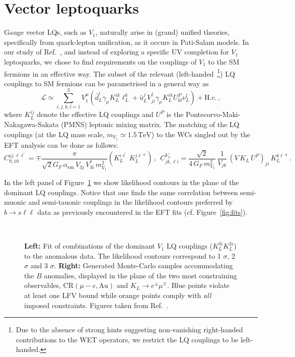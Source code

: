 \documentclass[a4paper,11pt]{article}
\def\bsll{b \to s\ell\ell}
\begin{document}
\section{Vector leptoquarks}
Gauge vector LQs, such as $V_1$, naturally arise in (grand) unified theories, specifically from quark-lepton unification, as it occurs in Pati-Salam models.
In our study of Ref.~\cite{Hati:2019ufv}, and  
instead of exploring a specific UV completion for $V_1$ leptoquarks, we chose to find requirements on the couplings of $V_1$ to the SM fermions in an effective way.
The subset of the relevant 
(left-handed~\footnote{Due to the absence of strong hints 
suggesting non-vanishing right-handed contributions to the WET operators, we restrict the LQ couplings to be left-handed.}) LQ couplings to SM fermions 
can be parametrised in a general way as
\begin{equation}
    \mathcal L \simeq \sum_{i,j,k,l = 1}^{3} V_1^\mu \left(\bar d_L^i\gamma_\mu K_L^{ik}\ell_L^k + \bar u_L^j V_{ji}^\dagger \gamma_\mu K_L^{ik} U_{kl}^P\nu_L^l \right) + \mathrm{H.c.}\,,
\end{equation}
where $K_L^{ij}$ denote the effective LQ couplings and $U^P$ is the Pontecorvo-Maki-Nakagawa-Sakata (PMNS) leptonic mixing matrix.
The matching of the LQ couplings (at the LQ mass scale, $m_{V_1} \simeq 1.5\,\mathrm{TeV}$) to the WCs singled out by the EFT analysis can be done as follows:
\begin{equation}
C^{ij;\ell \ell^{\prime}}_{9,10} = \mp\frac{\pi}{\sqrt{2}G_F\,\alpha_\mathrm{em}\,V_{3j}\,V_{3i}^{\ast} \,m_{V_1}^2}\left(K_L^{i
  \ell^\prime} \,K_L^{j\ell\ast} \right)\,,\ \ 
  C_{jk,\ell i}^{V_L} = \frac{\sqrt{2}}{4\,G_{F}\,m_{V_1}^2}\,
  \frac{1}{V_{jk}}\,
  (V\,K_{L}\, U^P)_{ji}\, K_{L}^{k\ell\ast}\,.
  \label{eqn:CV}
\end{equation}

In the left panel of Figure~\ref{fig:LQfit} we show likelihood contours in the plane of the dominant LQ couplings. Notice that one finds the same correlation between semi-muonic and semi-tauonic couplings in the likelihood contours preferred by $\bsll$ data as previously encountered in the EFT fits (cf. Figure~\ref{fig:fits}).

\begin{figure}
    \centering
    \mbox{
    \raisebox{-8mm}{\texttt{[image: RK\_RD\_mue.pdf]}}}
    \caption{{\bf Left:} Fit of combinations of the dominant $V_1$ LQ couplings ($K_L^{3i}K_L^{2i}$) to the anomalous data. The likelihood contours correspond to 1 $\sigma$, 2 $\sigma$ and 3 $\sigma$. {\bf Right:} Generated Monte-Carlo samples accommodating the $B$ anomalies, displayed in the plane of the two most constraining observables, CR$(\mu-e, \mathrm{Au})$ and $K_L \to e^\pm \mu^\mp$. Blue points violate at least one LFV bound while orange points comply with {\it all} imposed constraints. Figures taken from Ref.~\cite{Hati:2019ufv}.}
    \label{fig:LQfit}
\end{figure}
\end{document}
